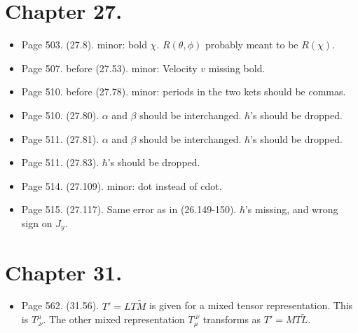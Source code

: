\section{Chapter 27.}
\begin{itemize}
\item Page 503.  (27.8).  minor: bold $\chi$.  $R(\theta, \phi)$ probably meant to be $R(\chi)$.
\item Page 507.  before (27.53).  minor: Velocity $v$ missing bold.
\item Page 510.  before (27.78).  minor: periods in the two kets should be commas.
\item Page 510.  (27.80).  $\alpha$ and $\beta$ should be interchanged.  $\hbar$'s should be dropped.
\item Page 511.  (27.81).  $\alpha$ and $\beta$ should be interchanged.  $\hbar$'s should be dropped.
\item Page 511.  (27.83).  $\hbar$'s should be dropped.
\item Page 514.  (27.109).  minor: dot instead of cdot.
\item Page 515.  (27.117).  Same error as in (26.149-150).  $\hbar$'s missing, and wrong sign on $J_y$.
\end{itemize}

\section{Chapter 31.}
\begin{itemize}
\item Page 562.  (31.56).  $T' = L T \tilde{M}$ is given for a mixed tensor representation.  This is $T^\mu_{.\nu}$.  The other mixed representation $T_{\mu}^{.\nu}$ transforms as $T' = M T \tilde{L}$.
\end{itemize}

